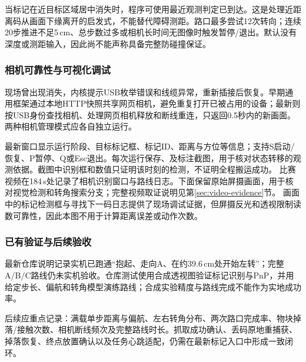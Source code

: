 当标记在近目标区域居中消失时，程序可使用最近观测判定已到达。这是处理近距离码从画面下缘离开的启发式，不能替代障碍测距。路口最多尝试12次转向；连续20步推进不足5\,cm、总步数过多或相机长时间无图像时触发暂停/退出。默认没有深度或测距输入，因此尚不能声称具备完整防碰撞保证。

\subsubsection{相机可靠性与可视化调试}
现场曾出现消失，内核提示USB枚举错误和线缆异常，重新插接后恢复。早期通用框架通过本地HTTP快照共享网页相机，避免重复打开已被占用的设备；最新则按USB身份查找相机、处理网页相机释放和断线重连，只返回0.5秒内的新画面。两种相机管理模式应各自独立运行。

最新窗口显示运行阶段、目标标记框、标记ID、距离与方位等信息；支持S启动/恢复、P暂停、Q或Esc退出。每次运行保存、及标注截图，用于核对状态转移的观测依据。截图中识别框和数值只证明该时刻的检测，不证明全程搬运成功。
比赛视频在184\,s处记录了相机识别窗口与路线日志。下面保留原始屏摄画面，用于核对视觉检测和转角搜索分支；完整视频取证说明见第\ref{sec:video-evidence}节。
画面中的标记检测框与寻找下一码日志提供了现场调试证据，但屏摄反光和透视限制读数可靠性，因此本图不用于计算距离误差或动作次数。

\subsubsection{已有验证与后续验收}
最新仓库说明记录实机已跑通“抱起、走向A、在约39.6\,cm处开始左转”；完整A/B/C路线仍未实机验收\cite{maze}。仓库测试使用合成透视图验证标记识别与PnP，并用给定步长、偏航和转角模型演练路线；合成实验精度与路线完成不能作为实地成功率。

后续应重点记录：满载单步距离与偏航、左右转角分布、两次路口完成率、物块掉落/接触次数、相机断线频次及完整路线时长。抓取成功确认、丢码原地重捕获、掉落恢复、终点放置确认以及任务心跳适配，仍需在最新标记入口中形成一致闭环。
